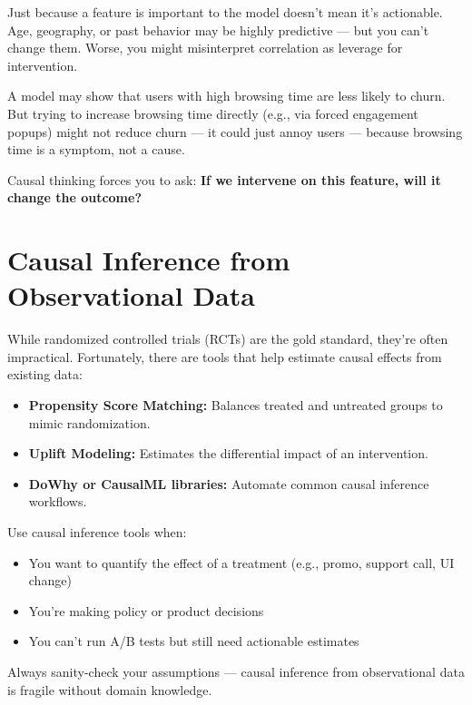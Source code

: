 \documentclass[12pt,openany]{book}
\begin{document}
Just because a feature is important to the model doesn't mean it's actionable. Age, geography, or past behavior may be highly predictive — but you can’t change them. Worse, you might misinterpret correlation as leverage for intervention.

\begin{examplebox}
A model may show that users with high browsing time are less likely to churn. But trying to increase browsing time directly (e.g., via forced engagement popups) might not reduce churn — it could just annoy users — because browsing time is a symptom, not a cause.
\end{examplebox}

Causal thinking forces you to ask: \textbf{If we intervene on this feature, will it change the outcome?}

\section{Causal Inference from Observational Data}

While randomized controlled trials (RCTs) are the gold standard, they’re often impractical. Fortunately, there are tools that help estimate causal effects from existing data:
\begin{itemize}
  \item \textbf{Propensity Score Matching:} Balances treated and untreated groups to mimic randomization.
  \item \textbf{Uplift Modeling:} Estimates the differential impact of an intervention.
  \item \textbf{DoWhy or CausalML libraries:} Automate common causal inference workflows.
\end{itemize}

Use causal inference tools when:
\begin{itemize}
  \item You want to quantify the effect of a treatment (e.g., promo, support call, UI change)
  \item You’re making policy or product decisions
  \item You can’t run A/B tests but still need actionable estimates
\end{itemize}

\begin{notebox}
Always sanity-check your assumptions — causal inference from observational data is fragile without domain knowledge.
\end{notebox}
\end{document}
